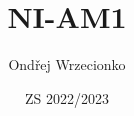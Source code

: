 \documentclass{article}
\title{NI-AM1}
\author{Ondřej Wrzecionko}
\date{ZS 2022/2023}
\begin{document}
\maketitle

\renewcommand{\contentsname}{Obsah}
\tableofcontents








\end{document}
